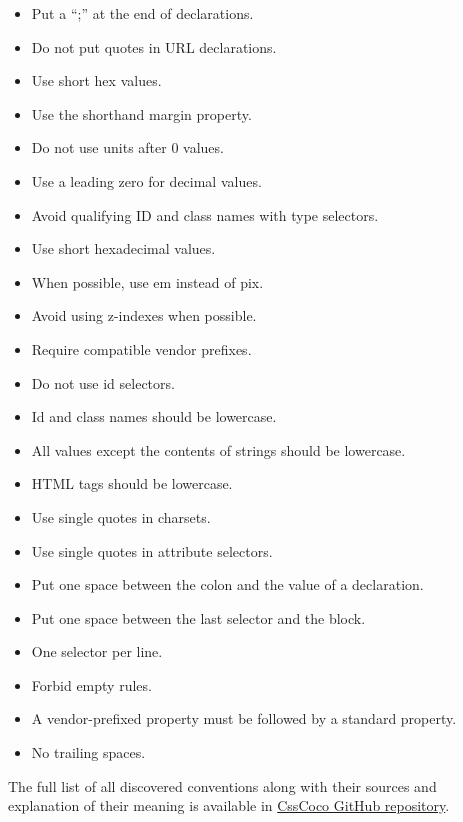 \begin{itemize} 
\item Put a ``;'' at the end of declarations. 
\item Do not put quotes in URL declarations.
\item Use short hex values.
\item Use the shorthand margin property.
\item Do not use units after 0 values.
\item Use a leading zero for decimal values.
\item Avoid qualifying ID and class names with type selectors. 
\item Use short hexadecimal values. 
\item When possible, use em instead of pix. 
\item Avoid using z-indexes when possible. 
\item Require compatible vendor prefixes. 
\item Do not use id selectors. 
\item Id and class names should be lowercase.
\item All values except the contents of strings should be lowercase.  
\item HTML tags should be lowercase.
\item Use single quotes in charsets.
\item Use single quotes in attribute selectors.
\item Put one space between the colon and the value of a declaration.
\item Put one space between the last selector and the block.
\item One selector per line.
\item Forbid empty rules.
\item A vendor-prefixed property must be followed by a standard property.
\item No trailing spaces.
\end{itemize}

The full list of all discovered conventions along with their sources and
explanation of their meaning is available in \href{https://github.com/boryanag
oncharenko/CssCoco/blob/master/analysis.md}{CssCoco GitHub repository}.

